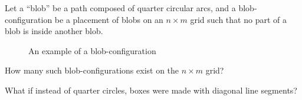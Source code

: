\documentclass{article}
\begin{document}
Let a ``blob'' be a path composed of quarter circular arcs, and a blob-configuration be
a placement of blobs on an $n \times m$ grid such that no part of a blob is
inside another blob.
\begin{figure}[ht!]
  \centering
  \caption{
    An example of a blob-configuration
  }
\end{figure}
\begin{question}
  How many such blob-configurations exist on the $n \times m$ grid?
\end{question}

\begin{related}
  \item What if instead of quarter circles, boxes were made with diagonal line
    segments?
\end{related}
\end{document}
